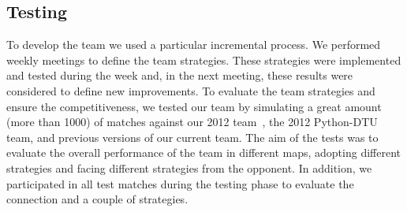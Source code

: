 \subsection{Testing}

To develop the team we used a particular incremental process. We performed weekly meetings to define the team strategies. These strategies were implemented and tested during the week and, in the next meeting, these results were considered to define new improvements. To evaluate the team strategies and ensure the competitiveness, we tested our team by simulating a great amount (more than 1000) of matches against our 2012 team~\cite{smadas:2012}, the 2012 Python-DTU team, and previous versions of our current team. The aim of the tests was to evaluate the overall performance of the team in different maps, adopting different strategies and facing different strategies from the opponent. In addition, we participated in all test matches during the testing phase to evaluate the connection and a couple of strategies.
